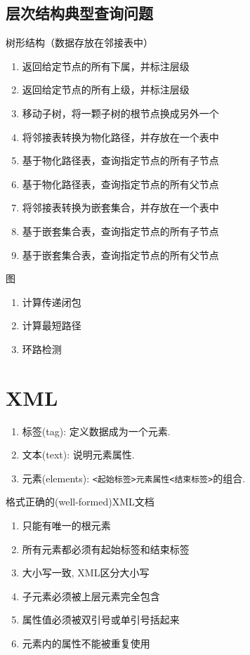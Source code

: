 \subsection{层次结构典型查询问题}

树形结构（数据存放在邻接表中）
\begin{enumerate}
    \item 返回给定节点的所有下属，并标注层级
    \item 返回给定节点的所有上级，并标注层级
    \item 移动子树，将一颗子树的根节点换成另外一个
    \item 将邻接表转换为物化路径，并存放在一个表中
    \item 基于物化路径表，查询指定节点的所有子节点
    \item 基于物化路径表，查询指定节点的所有父节点
    \item 将邻接表转换为嵌套集合，并存放在一个表中
    \item 基于嵌套集合表，查询指定节点的所有子节点
    \item 基于嵌套集合表，查询指定节点的所有父节点
\end{enumerate}

图
\begin{enumerate}
    \item 计算传递闭包
    \item 计算最短路径
    \item 环路检测
\end{enumerate}

\section{XML}

\begin{enumerate}
    \item 标签(tag): 定义数据成为一个元素.
    \item 文本(text): 说明元素属性.
    \item 元素(elements): \texttt{<起始标签>元素属性<结束标签>}的组合.
\end{enumerate}

格式正确的(well-formed)XML文档
\begin{enumerate}
    \item 只能有唯一的根元素
    \item 所有元素都必须有起始标签和结束标签
    \item 大小写一致, XML区分大小写
    \item 子元素必须被上层元素完全包含
    \item 属性值必须被双引号或单引号括起来
    \item 元素内的属性不能被重复使用
\end{enumerate}

